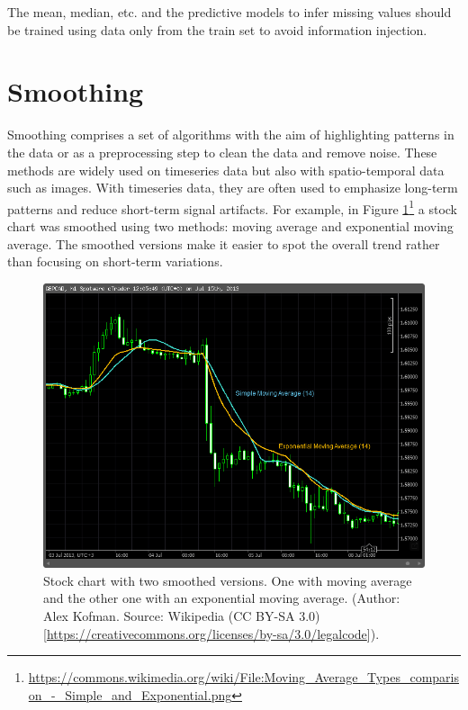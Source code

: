 \documentclass[
  11pt,
]{krantz}
\makeatletter
\newenvironment{kframe}{%
\medskip{}
\setlength{\fboxsep}{.8em}
 \def\at@end@of@kframe{}%
 \ifinner\ifhmode%
  \def\at@end@of@kframe{\end{minipage}}%
  \begin{minipage}{\columnwidth}%
 \fi\fi%
 \def\FrameCommand##1{\hskip\@totalleftmargin \hskip-\fboxsep
 \colorbox{shadecolor}{##1}\hskip-\fboxsep
     \hskip-\linewidth \hskip-\@totalleftmargin \hskip\columnwidth}%
 \MakeFramed {\advance\hsize-\width
   \@totalleftmargin\z@ \linewidth\hsize
   \@setminipage}}%
 {\par\unskip\endMakeFramed%
 \at@end@of@kframe}
\newenvironment{rmdblock}[1]
  {
  \begin{itemize}
  \renewcommand{\labelitemi}{
    \raisebox{-.7\height}[0pt][0pt]{
      {\setkeys{Gin}{width=3em,keepaspectratio}\texttt{[image: images/icons/\#1]}}
    }
  }
  \setlength{\fboxsep}{1em}
  \begin{kframe}
  \item
  }
  {
  \end{kframe}
  \end{itemize}
  }
\newenvironment{rmdcaution}
  {\begin{rmdblock}{caution}}
  {\end{rmdblock}}
\makeatother
\begin{document}
\begin{rmdcaution}
The mean, median, etc. and the predictive models to infer missing values should be trained using data only from the train set to avoid information injection.
\end{rmdcaution}

\hypertarget{smoothing}{%
\section{Smoothing}\label{smoothing}}

Smoothing comprises a set of algorithms with the aim of highlighting patterns in the data or as a preprocessing step to clean the data and remove noise. These methods are widely used on timeseries data but also with spatio-temporal data such as images. With timeseries data, they are often used to emphasize long-term patterns and reduce short-term signal artifacts. For example, in Figure \ref{fig:smoothingStock}\footnote{\url{https://commons.wikimedia.org/wiki/File:Moving_Average_Types_comparison_-_Simple_and_Exponential.png}} a stock chart was smoothed using two methods: moving average and exponential moving average. The smoothed versions make it easier to spot the overall trend rather than focusing on short-term variations.



\begin{figure}

{\centering \includegraphics[width=0.9\linewidth]{images/smoothing_stock} 

}

\caption{Stock chart with two smoothed versions. One with moving average and the other one with an exponential moving average. (Author: Alex Kofman. Source: Wikipedia (CC BY-SA 3.0) {[}\url{https://creativecommons.org/licenses/by-sa/3.0/legalcode}{]}).}\label{fig:smoothingStock}
\end{figure}
\end{document}
